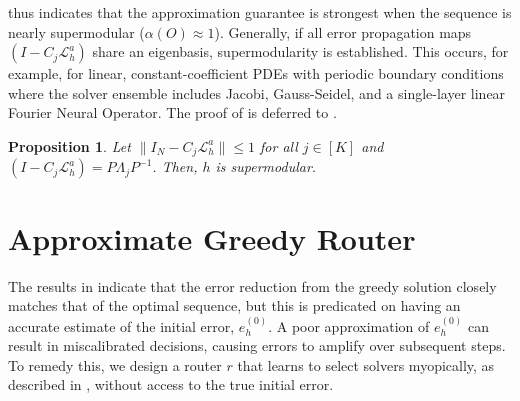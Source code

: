 \documentclass{article} %
\newtheorem{proposition}[theorem]{Proposition}
\begin{document}
 thus indicates that the approximation guarantee is strongest when the sequence is nearly supermodular ($\alpha(O) \approx 1$). Generally, if all error propagation maps $\left(I - C_j \mathcal{L}_{h}^a\right)$ share an eigenbasis,
supermodularity is established.
This occurs, for example, for linear, constant-coefficient PDEs with periodic boundary conditions where the solver ensemble includes Jacobi, Gauss-Seidel, and  a single-layer linear Fourier Neural Operator. 
The proof of  is deferred to .
\begin{proposition} \label{th:simultaneoussupermodular}
    Let $\|I_N - C_j\mathcal{L}_h^a\| \leq 1$ for all $j \in [K]$ and $\left(I - C_j \mathcal{L}_{h}^a\right) = P\Lambda_jP^{-1}$. Then, $h$ is supermodular. 
\end{proposition}


\section{Approximate Greedy Router} \label{sec:approxgreedy}

The results in  indicate that the error reduction from the greedy solution closely matches that of the optimal sequence, but this is predicated on having an accurate estimate of the initial error, $e^{(0)}_h$. A poor approximation of $e^{(0)}_h$ can result in miscalibrated decisions, causing errors to amplify over subsequent steps. To remedy this, we design a router $r$ that learns to select solvers myopically, as described in , without access to the true initial error. 
\end{document}
